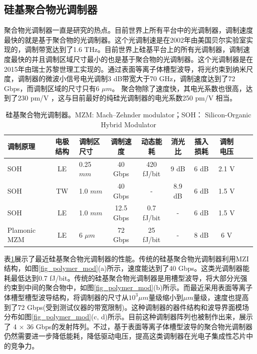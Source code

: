 \subsection{硅基聚合物光调制器}
聚合物光调制器一直是研究的热点。目前世界上所有平台中的光调制器，调制速度最快的就是基于聚合物的光调制器。这个光调制速是在2002年由美国贝尔实验室实现的，调制带宽达到了1.6 THz\cite{lee2002broadband}。目前世界上硅基平台上的所有光调制器，调制速度最快的并且调制区域尺寸最小的也是基于聚合物的光调制器。这个光调制器是在2015年由瑞士苏黎世理工实现的。通过表面等离子体槽型波导，将光约束到纳米尺度，调制器的微波小信号电光调制3 dB带宽大于70 GHz，调制速度达到了72 Gbps，而调制区域的尺寸只有6  $\mu m$。 聚合物除了速度快，其电光系数也很高，达到了230 pm/V \cite{palmer2014high}，这与目前最好的纯硅光调制器的电光系数250 pm/V \cite{timurdogan2014ultralow}相当。
{
	\begin{table}[htb]
		\caption{硅基聚合物光调制器。MZM:  Mach–Zehnder modulator；SOH： Silicon-Organic Hybrid Modulator}
		\label{sil_polymer_mod}
		\centering
		\begin{tabular}[t]{p{1.5cm}cp{1.2cm}ccccccc}
			\hline
			调制原理 & 电极结构 & 调制区尺寸 & 调制速度 & 动态能耗 & 消光比 & 插入损耗 & 调制电压\\
			\hline
			SOH\cite{palmer2014high} & LE  & 0.25 $mm$ & 40 Gbps & 420 fJ/bit & 9 dB & 6 dB & 2.1 V\\
			SOH\cite{palmer2014high} & TW  & 1.0 $mm$ & 40 Gbps & - & 8.9 dB & 6 dB & 1.5 V\\	
			SOH\cite{koeber2015femtojoule} & LE  & 1.0 $mm$ & 12.5 Gbps & 0.7 fJ/bit & - & 6 dB & 1.5 V\\			
			Plamonic MZM\cite{haffner2015all} & LE  & 6 $\mu m$ & 72 Gbps & 25 fJ/bit & - & 8 dB & 6 V\\
			\hline
		\end{tabular}
	\end{table}
}
表\ref{sil_polymer_mod}展示了最近硅基聚合物光调制器的性能。传统的硅基聚合物光调制器利用MZI结构，如图\ref{fig_polymer_mod}(a)所示，速度能达到了40 Gbps。这类光调制器能耗最低达到0.7 fJ/bit。传统的硅基聚合物光调制器是用槽型波导\cite{almeida2004guiding}，将大部分光强约束到中间的聚合物中，如图\ref{fig_polymer_mod}(b)所示\cite{palmer2014high,liu2015recent}。而最近采用表面等离子体槽型槽型波导结构，将调制器的尺寸从$10^3 \mu m$量级缩小到$\mu m$量级，速度也提高到了72 Gbps(受到测试仪器的带宽限制)\cite{haffner2015all}。这种调制器的器件结构和波导界面模场分布如图\ref{fig_polymer_mod}(c, d)所示。目前这种调制器阵列也被制作出来，展示了 4 $\times$ 36 Gbps的发射阵列\cite{heni2015high}。不过，基于表面等离子体槽型波导的聚合物光调制器仍然需要进一步降低能耗，降低驱动电压，提高这类调制器在光电子集成性芯片中的竞争力。

